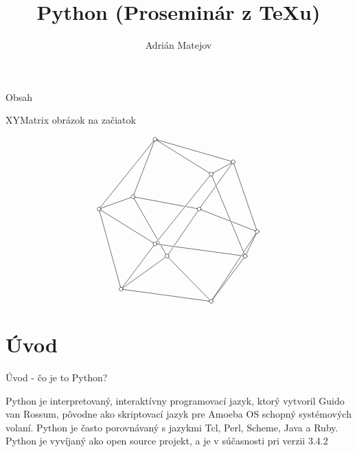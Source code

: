 \documentclass[12pt]{beamer}
\title[Prezentácia o pythone]{Python (Proseminár z \TeX u)}
\author[A. Matejov]{Adrián Matejov}
\institute{FMFI UK v Bratislave}
\begin{document}
\begin{frame}
    \titlepage
\end{frame}

\begin{frame}{Obsah}
    \tableofcontents
\end{frame}

\begin{frame}{XYMatrix obrázok na začiatok}
$$ \xymatrix@=0.3cm@1{
    & & & & & *++[Fo]{}\ar@{-}[ddrrrrrrr] \ar@{-}[dddrrrrr] \ar@{-}[dddddll] \ar@{-}[ddddddlllll] & & & & & & & & & \\
    \\
    & & & & & & & & & & & & *++[Fo]{} \ar@{-}[dll] \ar@{-}[ddddddrr] \ar@{-}[ddddlll]|!{[dll];[ddddddddr]}\hole & & \\
    & & & & & & & & & & *++[Fo]{} \ar@{-}[dddddddrrr] \ar@{-}[ddddddlllll] & & & & \\
    \\
    & & & *++[Fo]{} \ar@{-}[dlll] \ar@{-}[drrrrrr]|!{[uurrrrrrr];[ddddrr]}\hole \ar@{-}[dddddrrr]|!{[uurrrrrrr];[ddddrr]}\hole|!{[ddddrr];[dddddrrrrrrrrrr]}\hole & & & & & & & & & & & \\
    *++[Fo]{} \ar@{-}[dddrrrrr] \ar@{-}[dddddddrr] & & & & & & & & & *++[Fo]{} \ar@{-}[ddrrrrr]|!{[uuur];[ddddrrrr]}\hole \ar@{-}[ddddlll]|!{[dddllll];[ddddrrrr]}\hole & & & & & \\
    \\
    & & & & & & & & & & & & & & *++[Fo]{} \ar@{-}[ddl] \ar@{-}[ddddddllll]|!{[uuuuullll];[ddl]}\hole|!{[dlllllllll];[ddl]}\hole \\
    & & & & & *++[Fo]{} \ar@{-}[drrrrrrrr] \ar@{-}[ddddlll] & & & & & & & & & \\
    & & & & & & *++[Fo]{} \ar@{-}[dddllll] \ar@{-}[ddddrrrr] & & & & & & & *++[Fo]{} \ar@{-}[ddddlll] & \\
    \\
    \\
    & & *++[Fo]{} \ar@{-}[drrrrrrrr] & & & & & & & & & & & & \\
    & & & & & & & & & & *++[Fo]{} & & & & \\} $$
\end{frame}

\section{Úvod}
\begin{frame}{Úvod - čo je to Python?}
    \begin{center}
Python je interpretovaný, interaktívny programovací jazyk, ktorý vytvoril
Guido van Rossum, pôvodne ako skriptovací jazyk pre Amoeba OS schopný
systémových volaní. Python je často porovnávaný s jazykmi Tcl, Perl, Scheme,
Java a Ruby. Python je vyvíjaný ako open source projekt, a je v súčasnosti
pri verzii 3.4.2
    \end{center}
\end{frame}
\end{document}
